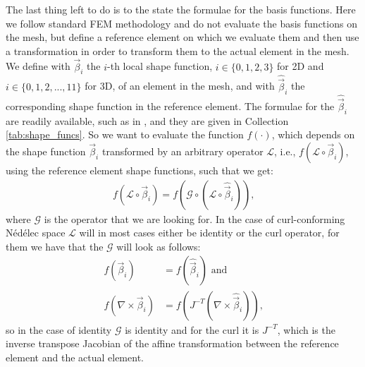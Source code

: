 The last thing left to do is to the state the formulae for the basis functions. Here we follow standard FEM methodology and do not evaluate the basis functions on the mesh, but define a reference element on which we evaluate them and then use a transformation in order to transform them to the actual element in the mesh. We define with \(\vec \beta_i\) the \(i\)-th local shape function, \(i \in \{0,1,2,3\}\) for 2D and \(i \in \{0,1,2,...,11\}\) for 3D, of an element in the mesh, and with \(\hat{\vec{\beta}}_i\) the corresponding shape function in the reference element. The formulae for the \(\hat{\vec{\beta}}_i\) are readily available, such as in \cite{maxwellBook}, and they are given in Collection \ref{tab:shape_funcs}. So we want to evaluate the function \(f(\cdot)\), which depends on the shape function \(\vec\beta_i\) transformed by an arbitrary operator \(\mathcal{L}\), i.e., \(f(\mathcal L \circ \vec \beta_i)\), using the reference element shape functions, such that we get:
\begin{align}
    f(\mathcal L \circ \vec \beta_i) = f(\mathcal{G} \circ (\mathcal L \circ \hat{\vec{\beta}}_i))\text{,}
\end{align}
where \(\mathcal{G}\) is the operator that we are looking for. In the case of curl-conforming Nédélec space \(\mathcal{L}\) will in most cases either be identity or the curl operator, for them we have that the \(\mathcal{G}\) will look as follows:
\begin{align}
    f(\vec \beta_i) &= f(\hat{\vec{\beta}}_i) \text{ and } \\
    f(\nabla \times \vec \beta_i) &= f(J^{-T} (\nabla \times \hat{\vec{\beta}}_i))\text{,}
\end{align}
so in the case of identity \(\mathcal{G}\) is identity and for the curl it is \(J^{-T}\), which is the inverse transpose Jacobian of the affine transformation between the reference element and the actual element.

